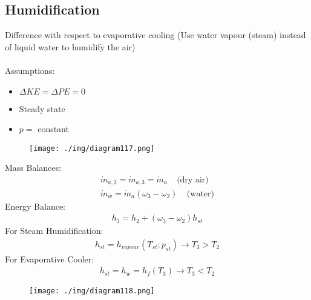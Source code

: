 \subsection{Humidification}
Difference with respect to evaporative cooling (Use water vapour (steam) instead of liquid water to humidify the air) \\\\
Assumptions:
\begin{itemize}[noitemsep]
  \item $\Delta KE = \Delta PE = 0$
  \item Steady state
  \item $p =$ constant
\end{itemize}
\begin{figure}[H]
  \centering
  \texttt{[image: ./img/diagram117.png]}
  \caption{}
\end{figure}
Mass Balances:
\begin{gather}
  \dot{m}_{a,2} = \dot{m}_{a,3} = \dot{m}_{a} \ \ \ \ \ \text{(dry air)} \\[5pt]
  \dot{m}_{w} = \dot{m}_{a}(\omega_3-\omega_2) \ \ \ \ \ \text{(water)}
\end{gather}
Energy Balance:
\begin{gather}
  h_3 = h_2 + (\omega_3-\omega_2)h_{st}
\end{gather}
For Steam Humidification:
\begin{gather}
  h_{st} = h_{vapour}(T_{st};p_{st}) \longrightarrow T_3>T_2
\end{gather}
For Evaporative Cooler:
\begin{gather}
  h_{st} = h_{w} = h_{f}(T_3) \longrightarrow T_3<T_2
\end{gather}
\begin{figure}[H]
  \centering
  \texttt{[image: ./img/diagram118.png]}
  \caption{}
\end{figure}
